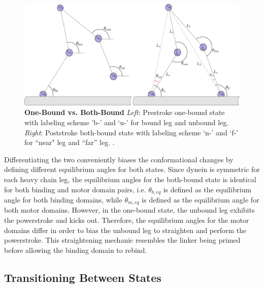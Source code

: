 \begin{figure}[H]
	\centering
	\includegraphics[width=0.9\columnwidth]{Figures/OB_vs_BB.PNG}
	\caption[One-Bound vs. Both-Bound]{\textbf{One-Bound vs. Both-Bound} \textit{Left}: Prestroke one-bound state with labeling scheme 'b-’ and ‘u-’ for bound leg and unbound leg. \textit{Right}: Poststroke both-bound state with labeling scheme ‘n-’ and ‘f-’ for ``near" leg and ``far'' leg. \cite{Capek2017}.}
	\label{fig:OBvsBB}
\end{figure}

Differentiating the two conveniently biases the conformational changes by defining different equilibrium angles for both states. Since dynein is symmetric for each heavy chain leg, the equilibrium angles for the both-bound state is identical for both binding and motor domain pairs, i.e. $\theta_{b,eq}$ is defined as the equilibrium angle for both binding domains, while $\theta_{m,eq}$ is defined as the equilibrium angle for both motor domains. However, in the one-bound state, the unbound leg exhibits the powerstroke and kicks out. Therefore, the equilibrium angles for the motor domains differ in order to bias the unbound leg to straighten and perform the powerstroke. This straightening mechanic resembles the linker being primed before allowing the binding domain to rebind.


\subsection{Transitioning Between States}

